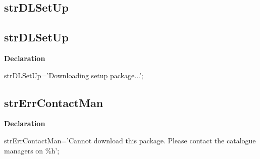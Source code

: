 \documentclass{report}
\newif\ifpdf
\begin{document}
\subsection*{\large{\textbf{strDLSetUp}}\normalsize\hspace{1ex}\hrulefill}
\else
\subsection*{strDLSetUp}
\fi
\label{trstrings-strDLSetUp}
\begin{list}{}{
\setlength{\itemindent}{0cm}
\setlength{\listparindent}{0cm}
\setlength{\leftmargin}{\evensidemargin}
\addtolength{\leftmargin}{\tmplength}
\settowidth{\labelsep}{X}
\addtolength{\leftmargin}{\labelsep}
\setlength{\labelwidth}{\tmplength}
}
\item[\textbf{Declaration}\hfill]
\ifpdf
\begin{flushleft}
\fi
\begin{ttfamily}
strDLSetUp='Downloading setup package...';\end{ttfamily}

\ifpdf
\end{flushleft}
\fi

\end{list}
\ifpdf
\subsection*{\large{\textbf{strErrContactMan}}\normalsize\hspace{1ex}\hrulefill}
\else
\subsection*{strErrContactMan}
\fi
\label{trstrings-strErrContactMan}
\begin{list}{}{
\setlength{\itemindent}{0cm}
\setlength{\listparindent}{0cm}
\setlength{\leftmargin}{\evensidemargin}
\addtolength{\leftmargin}{\tmplength}
\settowidth{\labelsep}{X}
\addtolength{\leftmargin}{\labelsep}
\setlength{\labelwidth}{\tmplength}
}
\item[\textbf{Declaration}\hfill]
\ifpdf
\begin{flushleft}
\fi
\begin{ttfamily}
strErrContactMan='Cannot download this package. Please contact the catalogue managers on {\%}h';\end{ttfamily}

\ifpdf
\end{flushleft}
\fi

\end{list}
\ifpdf
\end{document}

